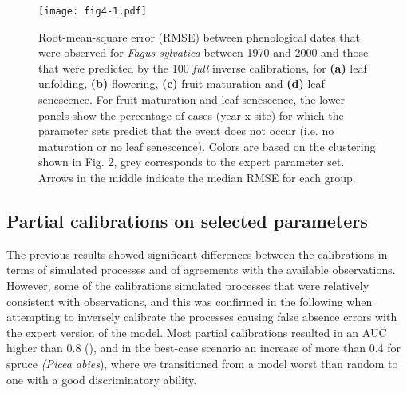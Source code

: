 \documentclass[preprint,12pt,authoryear]{elsarticle}
\begin{document}
\begin{figure}
\centering
\begin{subcaptiongroup}
\label{fig:3A} 
\label{fig:3B}
\label{fig:3C}
\label{fig:3D}
\label{fig:3E}
\end{subcaptiongroup}
\centerline{\texttt{[image: fig4-1.pdf]}}
\caption{Root-mean-square error (RMSE) between phenological dates that were observed for \emph{Fagus sylvatica} between 1970 and 2000 and those that were predicted by the 100 \emph{full} inverse calibrations, for \textbf{(a)} leaf unfolding, \textbf{(b)} flowering, \textbf{(c)} fruit maturation and \textbf{(d)} leaf senescence. For fruit maturation and leaf senescence, the lower panels show the percentage of cases (year x site) for which the parameter sets predict that the event does not occur (i.e. no maturation or no leaf senescence). Colors are based on the clustering shown in Fig. 2, grey corresponds to the expert parameter set. Arrows in the middle indicate the median RMSE for each group.}
\label{fig:3}
\end{figure}

\subsection{Partial calibrations on selected parameters}

The previous results showed significant differences between the calibrations in terms of simulated processes and of agreements with the available observations. However, some of the calibrations simulated processes that were relatively consistent with observations, and this was confirmed in the following when attempting to inversely calibrate the processes causing false absence errors with the expert version of the model. Most partial calibrations resulted in an AUC higher than 0.8 (), and in the best-case scenario an increase of more than 0.4 for spruce \emph{(Picea abies}), where we transitioned from a model worst than random to one with a good discriminatory ability.
\end{document}
